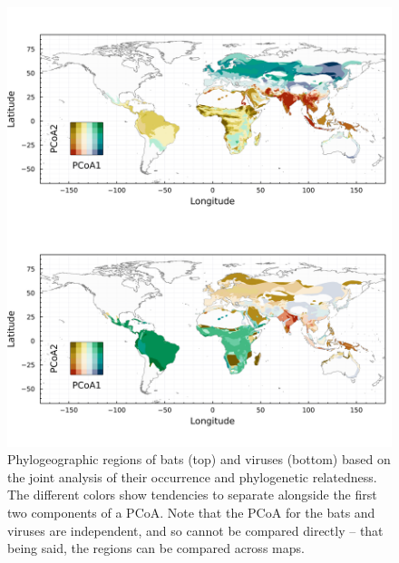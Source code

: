 \documentclass[10pt,oneside]{article}
\makeatletter
\def\maxwidth{\ifdim\Gin@nat@width>\linewidth\linewidth
\else\Gin@nat@width\fi}
\let\Oldincludegraphics\includegraphics
\renewcommand{\includegraphics}[1]{\Oldincludegraphics[width=\maxwidth]{#1}}
\makeatother
\begin{document}
\begin{figure}
\hypertarget{fig:biogeo}{%
\centering
\includegraphics{figures/combined_biogeo.png}
\caption{Phylogeographic regions of bats (top) and viruses (bottom)
based on the joint analysis of their occurrence and phylogenetic
relatedness. The different colors show tendencies to separate alongside
the first two components of a PCoA. Note that the PCoA for the bats and
viruses are independent, and so cannot be compared directly -- that
being said, the regions can be compared across maps.}\label{fig:biogeo}
}
\end{figure}
\end{document}
